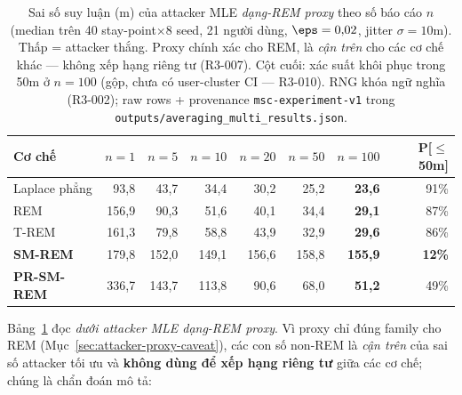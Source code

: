 \begin{table}[ht]
\centering
\caption[Sai số averaging đa-stay-point theo số báo cáo (attacker proxy)]{Sai số suy luận (m) của attacker MLE \emph{dạng-REM proxy} theo số báo
cáo $n$ (median trên 40 stay-point$\times$8 seed, 21 người dùng, $\eps=0{,}02$,
jitter $\sigma=10$m). Thấp = attacker thắng. Proxy chính xác cho REM, là
\emph{cận trên} cho các cơ chế khác --- không xếp hạng riêng tư (R3-007). Cột
cuối: xác suất khôi phục trong 50m ở $n{=}100$ (gộp, chưa có user-cluster CI ---
R3-010). RNG khóa ngữ nghĩa (R3-002); raw rows + provenance
\texttt{msc-experiment-v1} trong \texttt{outputs/averaging\_multi\_results.json}.}
\label{tab:averaging-multi}
\small
\begin{tabular}{lrrrrrr r}
\toprule
Cơ chế & $n{=}1$ & $n{=}5$ & $n{=}10$ & $n{=}20$ & $n{=}50$ & $n{=}100$ & P[$\le$50m] \\
\midrule
Laplace phẳng & 93,8 & 43,7 & 34,4 & 30,2 & 25,2 & \textbf{23,6} & 91\% \\
REM           & 156,9 & 90,3 & 51,6 & 40,1 & 34,4 & \textbf{29,1} & 87\% \\
T-REM         & 161,3 & 79,8 & 58,8 & 43,9 & 32,9 & \textbf{29,6} & 86\% \\
\textbf{SM-REM}   & 179,8 & 152,0 & 149,1 & 156,6 & 158,8 & \textbf{155,9} & \textbf{12\%} \\
\textbf{PR-SM-REM} & 336,7 & 143,7 & 113,8 & 90,6 & 68,0 & \textbf{51,2} & 49\% \\
\bottomrule
\end{tabular}
\end{table}

Bảng~\ref{tab:averaging-multi} đọc \emph{dưới attacker MLE dạng-REM proxy}. Vì
proxy chỉ đúng family cho REM (Mục~\ref{sec:attacker-proxy-caveat}), các con số
non-REM là \emph{cận trên} của sai số attacker tối ưu và \textbf{không dùng để
xếp hạng riêng tư} giữa các cơ chế; chúng là chẩn đoán mô tả:

